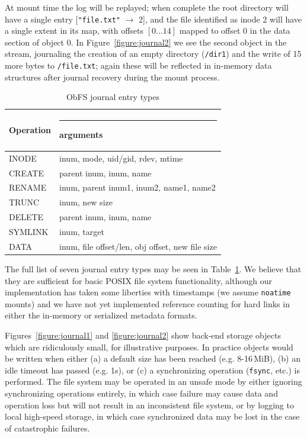 At mount time the log will be replayed; when complete the root directory will have a single entry [\texttt{"file.txt"} $\rightarrow$ 2], and the file identified as inode 2 will have a single extent in its map, with offsets $[0\ldots 14]$ mapped to offset 0 in the data section of object 0.
In Figure~\ref{figure:journal2} we see the second object in the stream, journaling the creation of an empty directory (\texttt{/dir1}) and the write of 15 more bytes to \texttt{/file.txt}; again these will be reflected in in-memory data structures after journal recovery during the mount process.

\begin{table}
  \begin{tabular}{l|l}
    Operation & \rule{4em}{0pt} arguments \\
    \hline
    INODE & inum, mode, uid/gid, rdev, mtime \\
    CREATE & parent inum, inum, name \\
    RENAME & inum, parent inum1, inum2, name1, name2 \\
    TRUNC & inum, new size\\
    DELETE & parent inum, inum, name \\
    SYMLINK & inum, target\\
    DATA & inum, file offset/len, obj offset, new file size\\
    \hline
  \end{tabular} \vspace{0.5\baselineskip}
  \caption{ObFS journal entry types}
  \label{table:journal}
\end{table}

The full list of seven journal entry types may be seen in Table~\ref{table:journal}.
We believe that they are sufficient for basic POSIX file system functionality, although our implementation has taken some liberties with timestamps (we assume \texttt{noatime} mounts) and we have not yet implemented reference counting for hard links in either the in-memory or serialized metadata formats.

Figures~\ref{figure:journal1} and \ref{figure:journal2} show back-end storage objects which are ridiculously small, for illustrative purposes.
In practice objects would be written when either (a) a default size has been reached (e.g. 8-16\,MiB), (b) an idle timeout has passed (e.g. 1s), or (c) a synchronizing operation (\texttt{fsync}, etc.) is performed.
The file system may be operated in an unsafe mode by either ignoring synchronizing operations entirely, in which case failure may cause data and operation loss but will not result in an inconsistent file system, or by logging to local high-speed storage, in which case synchronized data may be lost in the case of catastrophic failures.


